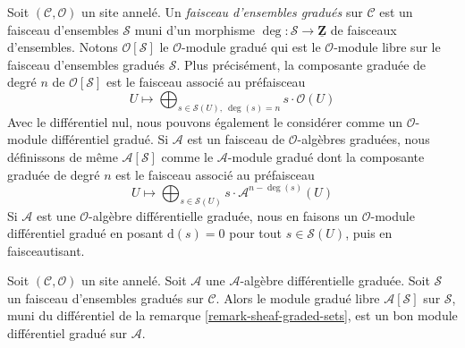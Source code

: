 \begin{remark}
\label{remark-sheaf-graded-sets}
Soit $(\mathcal{C}, \mathcal{O})$ un site annelé.
Un {\it faisceau d'ensembles gradués} sur $\mathcal{C}$ est un faisceau d'ensembles $\mathcal{S}$ muni d'un morphisme $\deg : \mathcal{S} \to \underline{\mathbf{Z}}$ de faisceaux d'ensembles.
Notons $\mathcal{O}[\mathcal{S}]$ le $\mathcal{O}$-module gradué qui est le $\mathcal{O}$-module libre sur le faisceau d'ensembles gradués $\mathcal{S}$.
Plus précisément, la composante graduée de degré $n$ de $\mathcal{O}[\mathcal{S}]$ est le faisceau associé au préfaisceau
$$
U \longmapsto
\bigoplus\nolimits_{s \in \mathcal{S}(U),\ \deg(s) = n} s \cdot \mathcal{O}(U)
$$
Avec le différentiel nul, nous pouvons également le considérer comme un $\mathcal{O}$-module différentiel gradué.
Si $\mathcal{A}$ est un faisceau de $\mathcal{O}$-algèbres graduées, nous définissons de même $\mathcal{A}[\mathcal{S}]$ comme le $\mathcal{A}$-module gradué dont la composante graduée de degré $n$ est le faisceau associé au préfaisceau
$$
U \longmapsto
\bigoplus\nolimits_{s \in \mathcal{S}(U)} s \cdot \mathcal{A}^{n - \deg(s)}(U)
$$
Si $\mathcal{A}$ est une $\mathcal{O}$-algèbre différentielle graduée, nous en faisons un $\mathcal{O}$-module différentiel gradué en posant $\text{d}(s) = 0$ pour tout $s \in \mathcal{S}(U)$, puis en faisceautisant.
\end{remark}

\begin{lemma}
\label{lemma-free-graded-module-good}
Soit $(\mathcal{C}, \mathcal{O})$ un site annelé.
Soit $\mathcal{A}$ une $\mathcal{A}$-algèbre différentielle graduée.
Soit $\mathcal{S}$ un faisceau d'ensembles gradués sur $\mathcal{C}$.
Alors le module gradué libre $\mathcal{A}[\mathcal{S}]$ sur $\mathcal{S}$, muni du différentiel de la remarque \ref{remark-sheaf-graded-sets}, est un bon module différentiel gradué sur $\mathcal{A}$.
\end{lemma}

